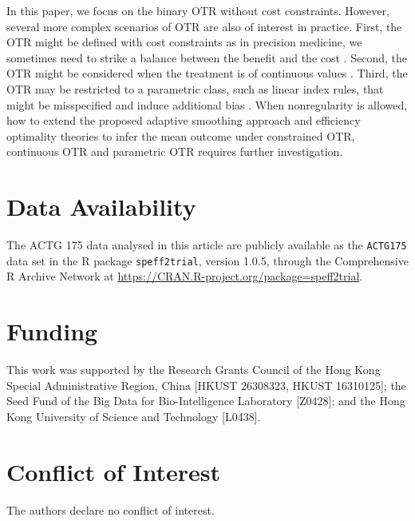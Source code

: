 \documentclass[11pt]{article}
\theoremstyle{referenceplain}
\theoremstyle{referencedefinition}
\theoremstyle{referenceremark}
\begin{document}
In this paper, we focus on the binary OTR without cost constraints. However, several more complex scenarios of OTR are also of interest in practice. First, the OTR might be defined with cost constraints as in precision medicine, we sometimes need to strike a balance between the benefit and the cost \citep{illenberger2023identifying}. Second, the OTR might be considered when the treatment is of continuous values \citep{ai2024data}. Third, the OTR may be restricted to a parametric class, such as linear index rules, that might be misspecified and induce additional bias \citep{wu2021resampling}. When nonregularity is allowed, how to extend the proposed adaptive smoothing approach and efficiency optimality theories to infer the mean outcome under constrained OTR, continuous OTR and parametric OTR requires further investigation.

\section*{Data Availability}
The ACTG 175 data analysed in this article are publicly available as the
\texttt{ACTG175} data set in the R package \texttt{speff2trial}, version
1.0.5, through the Comprehensive R Archive Network at
\url{https://CRAN.R-project.org/package=speff2trial}.

\section*{Funding}
This work was supported by the Research Grants Council of the Hong Kong Special Administrative Region, China [HKUST 26308323, HKUST 16310125]; the Seed Fund of the Big Data for Bio-Intelligence Laboratory [Z0428]; and the Hong Kong University of Science and Technology [L0438].

\section*{Conflict of Interest}
The authors declare no conflict of interest.
\end{document}
